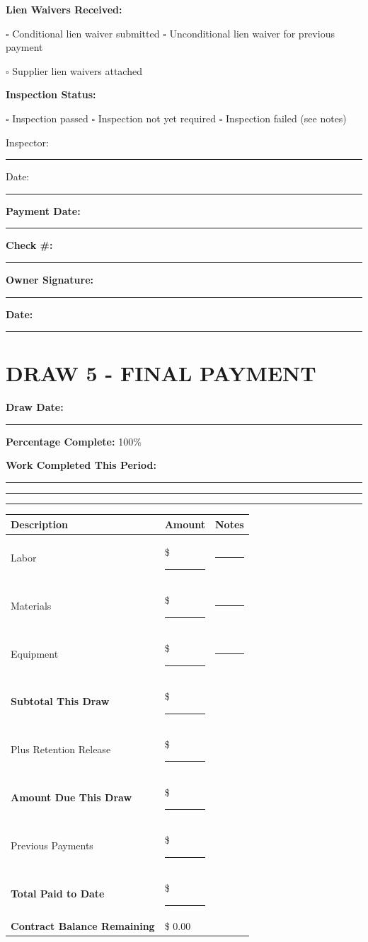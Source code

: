 \documentclass[11pt,letterpaper]{article}
\begin{document}
\vspace{6pt}

\textbf{Lien Waivers Received:}

$\square$ Conditional lien waiver submitted \hspace{0.3in} $\square$ Unconditional lien waiver for previous payment

$\square$ Supplier lien waivers attached

\textbf{Inspection Status:}

$\square$ Inspection passed \hspace{0.3in} $\square$ Inspection not yet required \hspace{0.3in} $\square$ Inspection failed (see notes)

Inspector: \rule{5cm}{0.4pt} Date: \rule{3cm}{0.4pt}

\textbf{Payment Date:} \rule{4cm}{0.4pt} \hspace{0.3in} \textbf{Check \#:} \rule{3cm}{0.4pt}

\textbf{Owner Signature:} \rule{5cm}{0.4pt} \textbf{Date:} \rule{2cm}{0.4pt}

\vspace{12pt}

\section*{DRAW 5 - FINAL PAYMENT}

\textbf{Draw Date:} \rule{4cm}{0.4pt} \hspace{0.5in} \textbf{Percentage Complete:} 100\%

\textbf{Work Completed This Period:}

\rule{14cm}{0.4pt}

\rule{14cm}{0.4pt}

\rule{14cm}{0.4pt}

\begin{tabular}{|p{3in}|p{1.5in}|p{1.5in}|}
\hline
\textbf{Description} & \textbf{Amount} & \textbf{Notes} \\
\hline
Labor & \$ \rule{1in}{0.4pt} & \rule{1in}{0.4pt} \\
\hline
Materials & \$ \rule{1in}{0.4pt} & \rule{1in}{0.4pt} \\
\hline
Equipment & \$ \rule{1in}{0.4pt} & \rule{1in}{0.4pt} \\
\hline
\textbf{Subtotal This Draw} & \$ \rule{1in}{0.4pt} & \\
\hline
Plus Retention Release & \$ \rule{1in}{0.4pt} & \\
\hline
\textbf{Amount Due This Draw} & \$ \rule{1in}{0.4pt} & \\
\hline
Previous Payments & \$ \rule{1in}{0.4pt} & \\
\hline
\textbf{Total Paid to Date} & \$ \rule{1in}{0.4pt} & \\
\hline
\textbf{Contract Balance Remaining} & \$ 0.00 & \\
\hline
\end{tabular}
\end{document}
